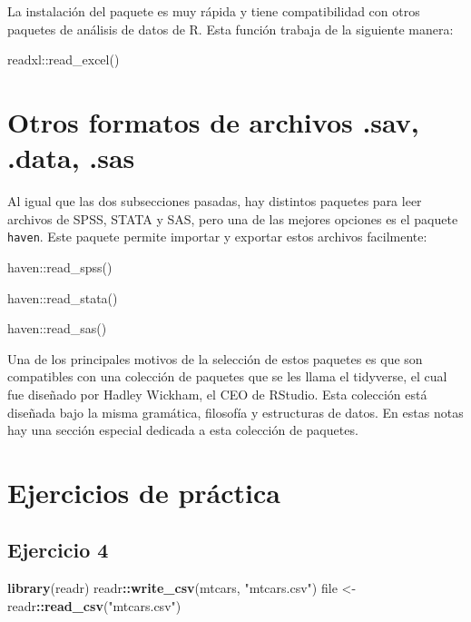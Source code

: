 \documentclass[]{book}
\newenvironment{Shaded}{\begin{snugshade}}{\end{snugshade}}
\newcommand{\KeywordTok}[1]{\textcolor[rgb]{0.13,0.29,0.53}{\textbf{#1}}}
\newcommand{\NormalTok}[1]{#1}
\newcommand{\OperatorTok}[1]{\textcolor[rgb]{0.81,0.36,0.00}{\textbf{#1}}}
\newcommand{\StringTok}[1]{\textcolor[rgb]{0.31,0.60,0.02}{#1}}
\begin{document}
La instalación del paquete es muy rápida y tiene compatibilidad con otros paquetes de análisis de datos de R. Esta función trabaja de la siguiente manera:

readxl::read\_excel()

\hypertarget{otros-formatos-de-archivos-.sav-.data-.sas}{%
\section{\texorpdfstring{Otros formatos de archivos \textbf{.sav}, \textbf{.data}, \textbf{.sas}}{Otros formatos de archivos .sav, .data, .sas}}\label{otros-formatos-de-archivos-.sav-.data-.sas}}

Al igual que las dos subsecciones pasadas, hay distintos paquetes para leer archivos de SPSS, STATA y SAS, pero una de las mejores opciones es el paquete \texttt{haven}. Este paquete permite importar y exportar estos archivos facilmente:

haven::read\_spss()

haven::read\_stata()

haven::read\_sas()

Una de los principales motivos de la selección de estos paquetes es que son compatibles con una colección de paquetes que se les llama el tidyverse, el cual fue diseñado por Hadley Wickham, el CEO de RStudio. Esta colección está diseñada bajo la misma gramática, filosofía y estructuras de datos. En estas notas hay una sección especial dedicada a esta colección de paquetes.

\hypertarget{ejercicios-de-pruxe1ctica}{%
\section{Ejercicios de práctica}\label{ejercicios-de-pruxe1ctica}}

\hypertarget{ejercicio-4}{%
\subsection{Ejercicio 4}\label{ejercicio-4}}

\begin{Shaded}
\begin{Highlighting}[]
\KeywordTok{library}\NormalTok{(readr)}
\NormalTok{readr}\OperatorTok{::}\KeywordTok{write_csv}\NormalTok{(mtcars, }\StringTok{"mtcars.csv"}\NormalTok{)}
\NormalTok{file <-}\StringTok{ }\NormalTok{readr}\OperatorTok{::}\KeywordTok{read_csv}\NormalTok{(}\StringTok{"mtcars.csv"}\NormalTok{)}
\end{Highlighting}
\end{Shaded}
\end{document}
